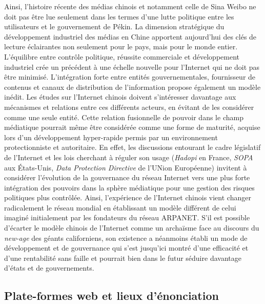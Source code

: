 Ainsi, l'histoire récente des médias chinois et notamment celle de Sina Weibo ne doit pas être lue seulement dans les termes d'une lutte politique entre les utilisateurs et le gouvernement de Pékin. La dimension stratégique du développement industriel des médias en Chine apportent aujourd'hui des clés de lecture éclairantes non seulement pour le pays, mais pour le monde entier. L'équilibre entre contrôle politique, réussite commerciale et développement industriel crée un précédent à une échelle nouvelle pour l'Internet qui ne doit pas être minimisé. L'intégration forte entre entités gouvernementales, fournisseur de contenus et canaux de distribution de l'information propose également un modèle inédit. Les études sur l'Internet chinois doivent s'intéresser davantage aux mécanismes et relations entre ces différents acteurs, en évitant de les considérer comme une seule entité. Cette relation fusionnelle de pouvoir dans le champ médiatique pourrait même être considérée comme une forme de maturité, acquise lors d'un développement hyper-rapide permis par un environnement protectionniste et autoritaire. En effet, les  discussions entourant le cadre législatif de l'Internet et les lois cherchant à réguler son usage (\textit{Hadopi} en France, \textit{SOPA} aux États-Unis, \textit{Data Protection Directive} de l'UNion Européenne) invitent à considérer l'évolution de la gouvernance du réseau Internet vers une plus forte intégration des pouvoirs dans la sphère médiatique pour une gestion des risques politiques plus contrôlée. Ainsi, l'expérience de l'Internet chinois vient changer radicalement le réseau mondial en établissant un modèle différent de celui imaginé initialement par les fondateurs du réseau ARPANET. S'il est possible d'écarter le modèle chinois de l'Internet comme un archaïsme face au discours du \textit{new-age} des géants californiens, son existence a néanmoins établi un mode de développement et de gouvernance qui s'est jusqu'ici montré d'une efficacité et d'une rentabilité sans faille et pourrait bien dans le futur séduire davantage d'états et de gouvernements.

\subsection{Plate-formes web et lieux d'énonciation}

